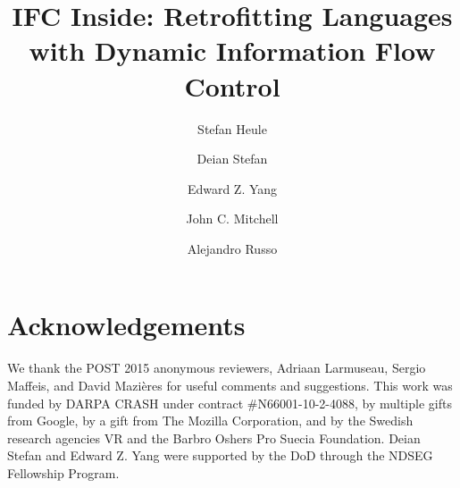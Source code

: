 \documentclass{llncs}
\newif\ifextended
\newif\ifextendedtitle
\begin{document}


\title{
IFC Inside: Retrofitting Languages with Dynamic Information Flow Control
}
\ifextendedtitle
\subtitle{Extended Version}
\fi

\author{
 Stefan Heule \and
 Deian Stefan \and
 Edward Z. Yang \and
 John C. Mitchell \and
 Alejandro Russo
}

\maketitle


\section*{Acknowledgements}
We thank the POST 2015 anonymous reviewers, 
Adriaan Larmuseau,
Sergio Maffeis, and
David Mazi\`eres
for useful comments and suggestions.
%
This work was funded by DARPA CRASH under contract \#N66001-10-2-4088,
by multiple gifts from Google, by a gift from The Mozilla Corporation,
and by the Swedish research agencies VR and the Barbro Oshers Pro
Suecia Foundation.
%
Deian Stefan and Edward Z. Yang were supported by the DoD through the
NDSEG Fellowship Program.


{\frenchspacing\scriptsize
  \setlength{\bibsep}{2pt}
  
  
}

\ifextended
\clearpage
\balance
\fi
\end{document}
